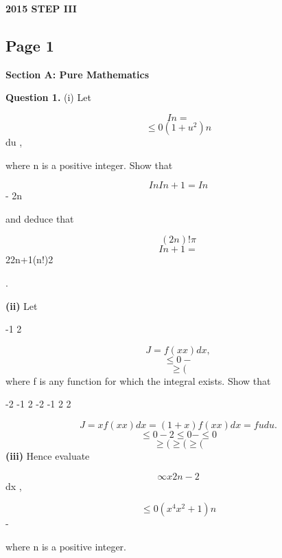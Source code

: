 \documentclass[12pt]{article}
\begin{document}
\begin{center}
{\Large \textbf{2015 STEP III}}
\end{center}

\subsection*{Page 1}
\begin{flushleft}
\bigskip\textbf{Section A: Pure Mathematics}\par
\bigskip\textbf{Question 1.} (i) Let\par
\infty\par
\[In =\]
\[\leq0 (1 + u^2)n\]
du ,\par
where n is a positive integer. Show that\par
\[In In+1 = In\]
- 2n\par
and deduce that\par
\[(2n)! \pi\]
\[In+1 =\]
22n+1(n!)2\par
.\par
\textbf{(ii)} Let\par
\infty\par
-1 2\par
\[J = f (x x ) dx ,\]
\[\leq0 -\]
\[\geq (\]
where f is any function for which the integral exists. Show that\par
\infty \infty \infty\par
-2 -1 2 -2 -1 2 2\par
\[J = x f (x x ) dx = (1 + x )f (x x ) dx = f u du .\]
\[\leq0 - 2 \leq0 - \leq0\]
\[\geq ( \geq ( \geq (\]
\textbf{(iii)} Hence evaluate\par
\[\infty x2n-2\]
dx ,\par
\[\leq0 (x^4 x^2 + 1)n\]
-\par
where n is a positive integer.\par
\end{flushleft}
\end{document}
